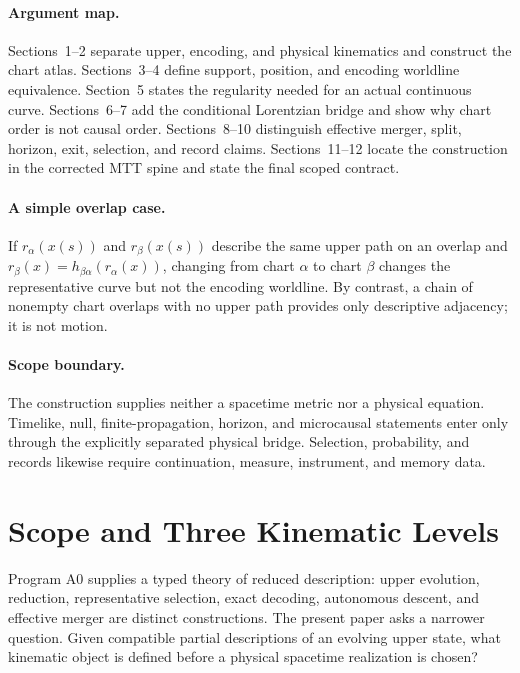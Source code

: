 \documentclass[11pt]{article}
\begin{document}
\paragraph{Argument map.}
Sections~1--2 separate upper, encoding, and physical kinematics and construct
the chart atlas.  Sections~3--4 define support, position, and encoding
worldline equivalence.  Section~5 states the regularity needed for an actual
continuous curve.  Sections~6--7 add the conditional Lorentzian bridge and
show why chart order is not causal order.  Sections~8--10 distinguish
effective merger, split, horizon, exit, selection, and record claims.
Sections~11--12 locate the construction in the corrected MTT spine and state
the final scoped contract.

\paragraph{A simple overlap case.}
If $r_\alpha(x(s))$ and $r_\beta(x(s))$ describe the same upper path on an
overlap and
$r_\beta(x)=h_{\beta\alpha}(r_\alpha(x))$, changing from chart $\alpha$ to
chart $\beta$ changes the representative curve but not the encoding
worldline.  By contrast, a chain of nonempty chart overlaps with no upper path
provides only descriptive adjacency; it is not motion.

\paragraph{Scope boundary.}
The construction supplies neither a spacetime metric nor a physical equation.
Timelike, null, finite-propagation, horizon, and microcausal statements enter
only through the explicitly separated physical bridge.  Selection,
probability, and records likewise require continuation, measure, instrument,
and memory data.

\tableofcontents
\newpage

\section{Scope and Three Kinematic Levels}

Program A0 supplies a typed theory of reduced description: upper evolution,
reduction, representative selection, exact decoding, autonomous descent, and
effective merger are distinct constructions. The present paper asks a narrower
question. Given compatible partial descriptions of an evolving upper state,
what kinematic object is defined before a physical spacetime realization is
chosen?
\end{document}
